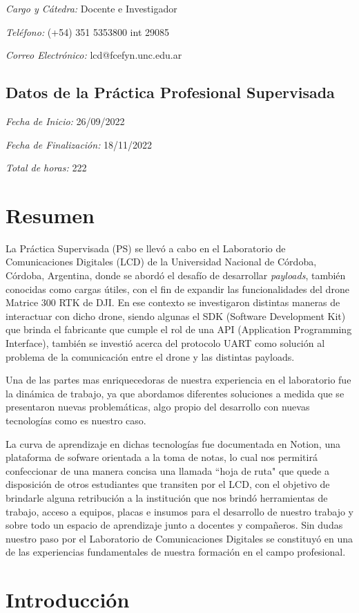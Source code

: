 \documentclass[12pt]{article}
\begin{document}
\textsl{Cargo y Cátedra:} Docente e Investigador

\textsl{Teléfono:} (+54) 351 5353800 int 29085

\textsl{Correo Electrónico:} lcd@fcefyn.unc.edu.ar

\subsection{Datos de la Práctica Profesional Supervisada}

\textsl{Fecha de Inicio:} 26/09/2022

\textsl{Fecha de Finalización:} 18/11/2022

\textsl{Total de horas:} 222

\tableofcontents
\newpage

\justifying
\section{Resumen}
\setlength\parindent{24pt} La Práctica Supervisada (PS) se llevó a cabo en el Laboratorio de Comunicaciones Digitales (LCD) de la Universidad Nacional de Córdoba, Córdoba, Argentina, donde se abordó el desafío de desarrollar \textit{payloads}, también conocidas como cargas útiles, con el fin de expandir las funcionalidades del drone Matrice 300 RTK de DJI.
En ese contexto se investigaron distintas maneras de interactuar con dicho drone, siendo algunas el SDK (Software Development Kit) que brinda el fabricante que cumple el rol de una API (Application Programming Interface), también se investió acerca del
protocolo UART como solución al problema de la comunicación entre el drone y las distintas payloads.

Una de las partes mas enriquecedoras de nuestra experiencia en el laboratorio fue la dinámica de trabajo, ya que 
abordamos diferentes soluciones a medida que se presentaron nuevas problemáticas, algo propio del desarrollo con
nuevas tecnologías como es nuestro caso. 

La curva de aprendizaje en dichas tecnologías fue documentada en Notion, una plataforma de sofware orientada a 
la toma de notas, lo cual nos permitirá confeccionar de una manera concisa una llamada ``hoja de ruta"  que quede
a disposición de otros estudiantes que transiten por el LCD, con el objetivo de brindarle alguna retribución a la institución
que nos brindó herramientas de trabajo, acceso a equipos, placas e insumos para el desarrollo de nuestro trabajo
y sobre todo un espacio de aprendizaje junto a docentes y compañeros. Sin dudas nuestro paso por el Laboratorio de
Comunicaciones Digitales se constituyó en una de las experiencias fundamentales de nuestra formación en el campo profesional.

\newpage
\section{Introducción}
\end{document}

